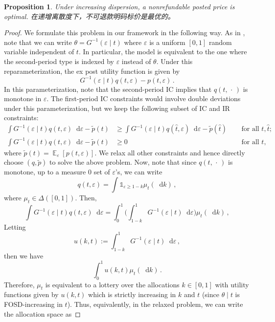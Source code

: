 \documentclass[12pt,letterpaper]{article}
\newenvironment{original}{\color{black}\noindent}{}
\newenvironment{translation}{\color{blue}\noindent}{}
\theoremstyle{plain}
\newtheorem{prop}{Proposition}
\theoremstyle{definition}
\theoremstyle{remark}
\DeclareMathOperator{\E}{\mathds{E}}
\renewcommand{\1}{\mathds{1}}
\renewcommand*\d{\mathop{}\!\mathrm{d}}
\theoremstyle{definition}
\begin{document}
\begin{prop}\label{prop:sequential}
\begin{original}
Under increasing dispersion, a nonrefundable posted price is optimal.
\end{original}
\begin{translation}
在递增离散度下，不可退款明码标价是最优的。
\end{translation}
\end{prop}
\begin{proof}
\begin{original}
We formulate this problem in our framework in the following way. As in \citet{Eso2007}, note that we can write $\theta = G^{-1}(\varepsilon \mid t)$ where $\varepsilon$ is a uniform $[0, 1]$ random variable independent of $t$. In particular, the model is equivalent to the one where the second-period type is indexed by $\varepsilon$ instead of $\theta$. Under this reparameterization, the ex post utility function is given by
\[G^{-1}(\varepsilon \mid t) q(t, \varepsilon) - p(t, \varepsilon)\,.\]
In this parameterization, note that the second-period IC implies that $q(t, \,\cdot\,)$ is monotone in $\varepsilon$. The first-period IC constraints would involve double deviations under this parameterization, but we keep the following subset of IC and IR constraints:
\begin{align*}
\int G^{-1}(\varepsilon \mid t) q(t, \varepsilon) \d \varepsilon - \tilde{p}(t) &\geq \int G^{-1}(\varepsilon \mid t) q(\hat{t}, \varepsilon) \d \varepsilon - \tilde{p}(\hat{t}) \, && \text{ for all $t, \hat{t}$;}\\
\int G^{-1}(\varepsilon \mid t) q(t, \varepsilon) \d \varepsilon - \tilde{p}(t) &\geq 0 && \text{ for all $t$,}
\end{align*}
where $\tilde{p}(t) = \E_\varepsilon[p(t, \varepsilon)]$. We relax all other constraints and hence directly choose $(q, \tilde{p})$ to solve the above problem. Now, note that since $q(t, \,\cdot\,)$ is monotone, up to a measure $0$ set of $\varepsilon$'s, we can write
\[q(t, \varepsilon) = \int \1_{\varepsilon \geq 1-k} \mu_t(\d k)\,,\]
where $\mu_t \in \Delta([0, 1])$. Then,
\[\int G^{-1}(\varepsilon \mid t) q(t, \varepsilon) \d \varepsilon = \int_0^1 \Big(\int^{1}_{1-k} G^{-1}(\varepsilon \mid t)\d \varepsilon\Big) \mu_t(\d k) \,,\]
Letting
\[u(k, t):= \int^{1}_{1 - k} G^{-1}(\varepsilon \mid t)\d \varepsilon\,,\]
then we have
\[\int_0^1 u(k, t) \mu_t(\d k) \,.\]
Therefore, $\mu_t$ is equivalent to a lottery over the allocations $k \in [0, 1]$ with utility functions given by $u(k, t)$ which is strictly increasing in $k$ and $t$ (since $\theta \mid t$ is FOSD-increasing in $t$). Thus, equivalently, in the relaxed problem, we can write the allocation space as

\end{original}
\end{proof}
\end{document}
